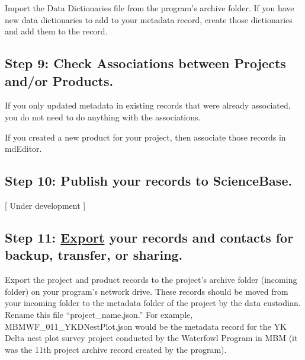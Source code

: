 \documentclass[
]{book}
\begin{document}
Import the Data Dictionaries file from the program's archive folder. If you have new data dictionaries to add to your metadata record, create those dictionaries and add them to the record.

\hypertarget{step-9-check-associations-between-projects-andor-products.}{%
\subsection*{Step 9: Check Associations between Projects and/or Products.}\label{step-9-check-associations-between-projects-andor-products.}}

If you only updated metadata in existing records that were already associated, you do not need to do anything with the associations.

If you created a new product for your project, then associate those records in mdEditor.

\hypertarget{step-10-publish-your-records-to-sciencebase.}{%
\subsection*{Step 10: Publish your records to ScienceBase.}\label{step-10-publish-your-records-to-sciencebase.}}

{[} Under development {]}

\hypertarget{step-11-export-your-records-and-contacts-for-backup-transfer-or-sharing.}{%
\subsection*{\texorpdfstring{Step 11: \protect\hyperlink{export}{Export} your records and contacts for backup, transfer, or sharing.}{Step 11: Export your records and contacts for backup, transfer, or sharing.}}\label{step-11-export-your-records-and-contacts-for-backup-transfer-or-sharing.}}

Export the project and product records to the project's archive folder (incoming folder) on your program's network drive. These records should be moved from your incoming folder to the metadata folder of the project by the data custodian. Rename this file ``project\_name.json.'' For example, MBMWF\_011\_YKDNestPlot.json would be the metadata record for the YK Delta nest plot survey project conducted by the Waterfowl Program in MBM (it was the 11th project archive record created by the program).
\end{document}
